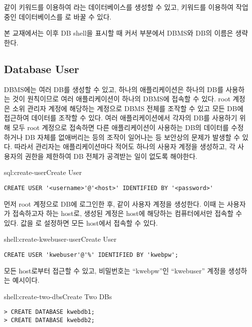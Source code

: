 \와 같이  키워드를 이용하여 라는 데이터베이스를 생성할 수 있고,  키워드를 이용하여 작업 중인 데이터베이스를 로 바꿀 수 있다.

본 교재에서는 이후 DB shell을 표시할 때 커서 부분에서 DBMS와 DB의 이름은 생략한다.

\subsection*{Database User}

DBMS에는 여러 DB를 생성할 수 있고, 하나의 애플리케이션은 하나의 DB를 사용하는 것이 원칙이므로 여러 애플리케이션이 하나의 DBMS에 접속할 수 있다. root 계정은 소위 관리자 계정에 해당하는 계정으로 DBMS 전체를 조작할 수 있고 모든 DB에 접근하여 데이터를 조작할 수 있다. 여러 애플리케이션에서 각자의 DB를 사용하기 위해 모두 root 계정으로 접속하면 다른 애플리케이션이 사용하는 DB의 데이터를 수정하거나 DB 자체를 없애버리는 등의 조작이 일어나는 등 보안상의 문제가 발생할 수 있다. 따라서 관리자는 애플리케이션마다 적어도 하나의 사용자 계정을 생성하고, 각 사용자의 권한을 제한하여 DB 전체가 공격받는 일이 없도록 해야한다.

\begin{sql}{sql:create-user}{Create User}
\begin{verbatim}
CREATE USER '<username>'@'<host>' IDENTIFIED BY '<password>'
\end{verbatim}
\end{sql}

먼저 root 계정으로 DB에 로그인한 후, \과 같이 사용자 계정을 생성한다. 이때 는 사용자가 접속하고자 하는 host로, 생성된 계정은 host에 해당하는 컴퓨터에서만 접속할 수 있다.  값을 \cd{\%}로 설정하면 모든 host에서 접속할 수 있다.

\begin{shell}{shell:create-kwebuser-user}{Create  User}
\begin{verbatim}
CREATE USER 'kwebuser'@'%' IDENTIFIED BY 'kwebpw';
\end{verbatim}
\end{shell}

\는 모든 host로부터 접근할 수 있고, 비밀번호는 ``kwebpw''인 ``kwebuser'' 계정을 생성하는 예시이다.

\begin{shell}{shell:create-two-dbs}{Create Two DBs}
\begin{verbatim}
> CREATE DATABASE kwebdb1;
> CREATE DATABASE kwebdb2;
\end{verbatim}
\end{shell}

